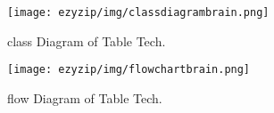 \begin{figure}[H]
	\centering
	 \texttt{[image: ezyzip/img/classdiagrambrain.png]}
	\caption{\small class Diagram of Table Tech.}
	\label{fig:polarization}
\end{figure}	
     

\begin{figure}[H]
	\centering
	 \texttt{[image: ezyzip/img/flowchartbrain.png]}
	\caption{\small flow Diagram of Table Tech.}
	\label{fig:polarization}
\end{figure}	
     









